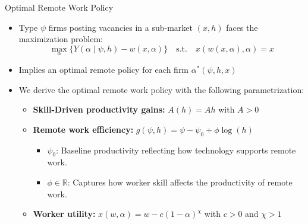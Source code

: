 \documentclass[aspectratio=1610]{beamer}
\begin{document}
\begin{frame}{Optimal Remote Work Policy}
    \begin{itemize}
        \item Type $\psi$ firms posting vacancies in a sub-market $(x,h)$ faces the maximization problem:\[\max_{\alpha} \{ Y(\alpha \mid \psi, h) - w(x,\alpha)\}\quad\text{s.t.}\quad x(w(x,\alpha), \alpha) = x\]%
        \item Implies an optimal remote policy for each firm $\alpha^*(\psi, h, x)$ %
        \item We derive the optimal remote work policy with the following parametrization:%
        \begin{itemize}
            \item \textbf{Skill-Driven productivity gains:} $A(h) = A h$ with $A > 0$ %
            \item \textbf{Remote work efficiency:} $g(\psi, h) = \psi - \psi_0 + \phi \log(h)$ 
            \begin{itemize}
                \item $\psi_0$: Baseline productivity reflecting how technology supports remote work. 
                \item $\phi \in \mathbb{R}$: Captures how worker skill affects the productivity of remote work.
            \end{itemize}%
            \item \textbf{Worker utility:} $x(w,\alpha)= w - c (1 - \alpha)^{\chi}$ with \( c > 0 \) and \( \chi > 1 \)
        \end{itemize}
    \end{itemize}  
\end{frame}
\end{document}
